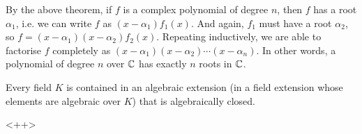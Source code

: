 By the above theorem, if $f$ is a complex polynomial of degree $n$, then $f$ has a root $\alpha_1$, i.e. we can write $f$ as $(x-\alpha_1) f_1(x)$. And again, $f_1$ must have a root $\alpha_2$, so $f = (x-\alpha_1) (x-\alpha_2) f_2(x)$. Repeating inductively, we are able to factorise $f$ completely as $(x-\alpha_1)(x-\alpha_2)\cdots (x-\alpha_n)$. In other words, a polynomial of degree $n$ over $\mathbb C$ has exactly $n$ roots in $\mathbb C$.
\begin{theorem}
  Every field $K$ is contained in an algebraic extension (in a field extension whose
  elements are algebraic over $K$) that is algebraically closed.
  \label{<+label+>}
\end{theorem}<++>
